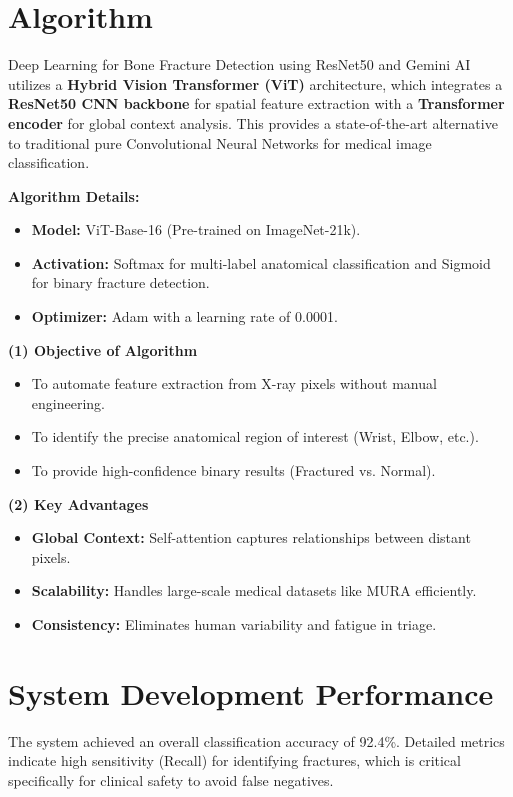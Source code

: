 \documentclass[a4paper,12pt]{report}
\begin{document}
    \section{Algorithm}
    Deep Learning for Bone Fracture Detection using ResNet50 and Gemini AI utilizes a \textbf{Hybrid Vision Transformer (ViT)} architecture, which integrates a \textbf{ResNet50 CNN backbone} for spatial feature extraction with a \textbf{Transformer encoder} for global context analysis. This provides a state-of-the-art alternative to traditional pure Convolutional Neural Networks for medical image classification.

    \textbf{Algorithm Details:}
    \begin{itemize}
        \item \textbf{Model:} ViT-Base-16 (Pre-trained on ImageNet-21k).
        \item \textbf{Activation:} Softmax for multi-label anatomical classification and Sigmoid for binary fracture detection.
        \item \textbf{Optimizer:} Adam with a learning rate of 0.0001.
    \end{itemize}

    \textbf{(1) Objective of Algorithm}
    \begin{itemize}
        \item To automate feature extraction from X-ray pixels without manual engineering.
        \item To identify the precise anatomical region of interest (Wrist, Elbow, etc.).
        \item To provide high-confidence binary results (Fractured vs. Normal).
    \end{itemize}

    \textbf{(2) Key Advantages}
    \begin{itemize}
        \item \textbf{Global Context:} Self-attention captures relationships between distant pixels.
        \item \textbf{Scalability:} Handles large-scale medical datasets like MURA efficiently.
        \item \textbf{Consistency:} Eliminates human variability and fatigue in triage.
    \end{itemize}

    \section{System Development Performance}
    \noindent The system achieved an overall classification accuracy of 92.4\%. Detailed metrics indicate high sensitivity (Recall) for identifying fractures, which is critical specifically for clinical safety to avoid false negatives.
\end{document}
